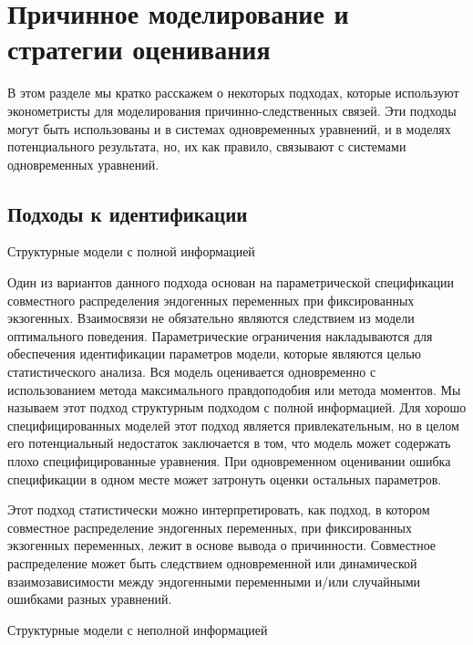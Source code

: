 \section{Причинное моделирование и стратегии оценивания}


В этом разделе мы кратко расскажем о некоторых подходах, которые используют эконометристы для моделирования причинно-следственных связей. Эти подходы могут быть использованы и в системах одновременных уравнений, и в моделях потенциального результата, но, их как правило, связывают с системами одновременных уравнений.

\subsection{Подходы к идентификации}
\begin{center}
Структурные модели с полной информацией
\end{center}

Один из вариантов данного подхода основан на параметрической спецификации совместного распределения эндогенных переменных при фиксированных экзогенных. Взаимосвязи не обязательно являются следствием из  модели оптимального поведения. Параметрические ограничения накладываются для обеспечения идентификации параметров модели, которые являются целью статистического анализа. Вся модель оценивается одновременно с использованием метода максимального правдоподобия или метода моментов. Мы называем этот подход структурным подходом с полной информацией. Для хорошо специфицированных моделей этот подход является привлекательным, но в целом его потенциальный недостаток заключается в том, что модель может содержать плохо специфицированные  уравнения. При одновременном оценивании ошибка спецификации в одном месте может затронуть оценки остальных параметров. 


Этот подход статистически можно интерпретировать, как подход, в котором совместное распределение  эндогенных переменных, при фиксированных экзогенных переменных, лежит в основе вывода о причинности. Совместное распределение может быть следствием одновременной или динамической взаимозависимости между эндогенными переменными и/или случайными ошибками разных уравнений.
	
	
\begin{center}
Структурные модели с неполной информацией
\end{center}

